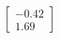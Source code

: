 \documentclass[preview]{standalone}
\begin{document}
\begin{align*}
\begin{bmatrix} -0.42 \\ 1.69 \end{bmatrix}
\end{align*}
\end{document}
